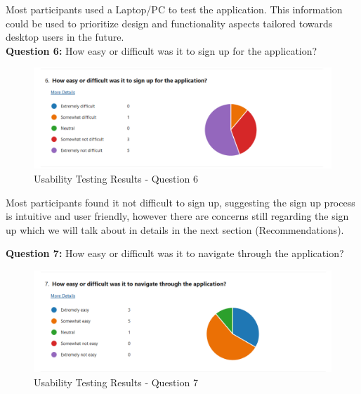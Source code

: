 \begin{justify}
\vspace{-0.25cm}
\newendline Most participants used a Laptop/PC to test the application. This information could be used to prioritize design and functionality aspects tailored towards desktop users in the future.\\


\vspace{0.25cm}
\newendline \textbf{Question 6:} How easy or difficult was it to sign up for the application?

\begin{figure}[H]
    \centerline{\includegraphics[width=150mm,scale=1]{figures/implementation_and_testing/testing/MUT/answers/Answers (6).png}}
    \caption{Usability Testing Results - Question 6}
    \label{Usability Testing Results - Question 6}
\end{figure}

\vspace{-0.25cm}
\newendline Most participants found it not difficult to sign up, suggesting the sign up process is intuitive and user friendly, however there are concerns still regarding the sign up which we will talk about in details in the next section (Recommendations).


\vspace{0.25cm}
\newendline \textbf{Question 7:} How easy or difficult was it to navigate through the application? 

\begin{figure}[H]
    \centerline{\includegraphics[width=150mm,scale=1]{figures/implementation_and_testing/testing/MUT/answers/Answers (7).png}}
    \caption{Usability Testing Results - Question 7}
    \label{Usability Testing Results - Question 7}
\end{figure}


\end{justify}

